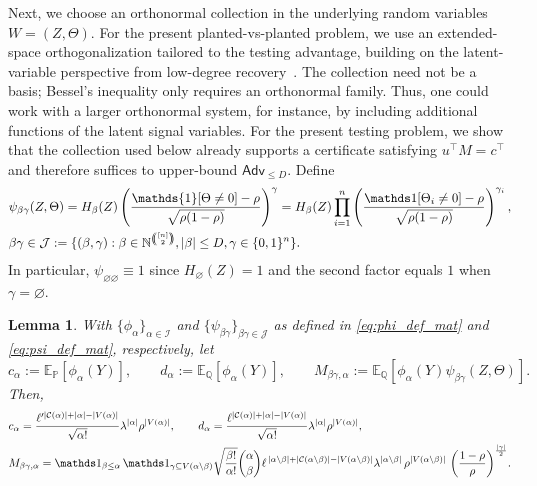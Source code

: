 \documentclass[11pt, letterpaper]{article}
\newtheorem{lemma}[theorem]{Lemma}
\numberwithin{equation}{section}
\newcommand{\Adv}{\mathsf{Adv}}
\newcommand{\cJ}{\mathcal{J}}
\newcommand{\cI}{\mathcal{I}}
\newcommand{\E}{\mathbb{E}}
\newcommand{\PP}{\mathbb{P}}
\newcommand{\QQ}{\mathbb{Q}}
\begin{document}
Next, we choose an orthonormal collection in the underlying random variables $W=(Z,\Theta)$. For the present planted-vs-planted problem, we use an extended-space orthogonalization tailored to the testing advantage, building on the latent-variable perspective from low-degree recovery~\cite{sohn2025sharp}. The collection need not be a basis; Bessel's inequality only requires an orthonormal family. Thus, one could work with a larger orthonormal system, for instance, by including additional functions of the latent signal variables. For the present testing problem, we show that the collection used below already supports a certificate satisfying $u^\top M=c^\top$ and therefore suffices to upper-bound $\Adv_{\le D}$. Define
\begin{align}
    &\psi_{\beta \gamma}(Z,\Theta)=H_\beta(Z) \left(\frac{\mathds{1}[\Theta \neq 0]-\rho}{\sqrt{\rho(1-\rho)}}\right)^{\gamma}= H_\beta(Z)
\prod_{i=1}^n
\left(\frac{\mathds 1[\Theta_i\neq0]-\rho}{\sqrt{\rho(1-\rho)}}\right)^{\gamma_i},\label{eq:psi_def_mat} \\
    & \notag \beta \gamma \in \mathcal J:=\{(\beta,\gamma):\beta \in\mathbb N^{\left(\!\!\binom{[n]}{2}\!\!\right)}, |\beta|\leq D, \gamma \in \{0,1\}^n\}.
\end{align}
 In particular, $\psi_{\varnothing\varnothing} \equiv 1$ since $H_\varnothing(Z) = 1$ and the second factor equals $1$ when $\gamma = \varnothing$. 
%
\begin{lemma}\label{lem:psm:cdM} With $\{\phi_{\alpha}\}_{\alpha \in \cI}$ and $\{\psi_{\beta\gamma}\}_{\beta\gamma \in \cJ}$ as defined in \eqref{eq:phi_def_mat} and \eqref{eq:psi_def_mat}, respectively, let
\[
c_\alpha:=\E_{\PP}[\phi_\alpha(Y)],
\qquad
d_\alpha:=\E_{\QQ}[\phi_\alpha(Y)],
\qquad
M_{\beta\gamma,\alpha}:=\E_{\QQ} \left[\phi_\alpha(Y)\psi_{\beta\gamma}(Z,\Theta)\right].
\]
Then,
\begin{align}
&c_\alpha=\frac{\ell'^{|\mathcal{C}(\alpha)|+|\alpha|-|V(\alpha)|}}{\sqrt{\alpha!}}\lambda^{|\alpha|}\rho^{|V(\alpha)|}
,\qquad d_\alpha=\frac{\ell^{|\mathcal{C}(\alpha)|+|\alpha|-|V(\alpha)|}}{\sqrt{\alpha!}}\lambda^{|\alpha|}\rho^{|V(\alpha)|}
\notag,
\\
 & M_{\beta\gamma,\alpha}=\mathds 1_{\beta\le\alpha}\,\mathds 1_{\gamma\subseteq V(\alpha\backslash\beta)} 
\sqrt{\frac{\beta!}{\alpha!}}
\binom{\alpha}{\beta} 
\ell^{\,|\alpha\backslash\beta|+|\mathcal{C}(\alpha\backslash\beta)|-|V(\alpha\backslash\beta)|} \lambda^{|\alpha\backslash\beta|}\,
\rho^{|V(\alpha\backslash\beta)|}\,
\,
 \bigg(\frac{1 - \rho}{\rho}\bigg)^{\frac{|\gamma|}{2}}
 \notag.
\end{align}
\end{lemma}
\end{document}
